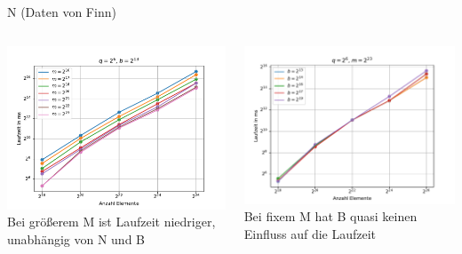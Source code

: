 \documentclass[ngerman,aspectratio=169,10pt]{beamer}
\begin{document}
\begin{frame}{N}
	\centering
	\vspace{-3px}
	(Daten von Finn)
	\vspace{2px}
	\begin{columns}
		\begin{column}{0.5\textwidth}
			\includegraphics[width=\textwidth]{Figure_4.pdf}
			Bei größerem M ist Laufzeit niedriger, unabhängig von N und B
		\end{column}
		\begin{column}{0.5\textwidth}
			\includegraphics[width=\textwidth]{Figure_5.pdf}
			Bei fixem M hat B quasi keinen Einfluss auf die Laufzeit
		\end{column}
	\end{columns}
\end{frame}
\end{document}
